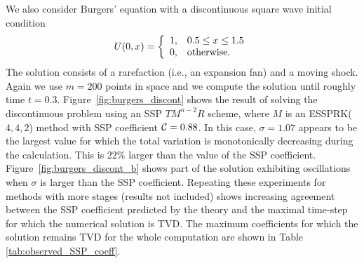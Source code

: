 We also consider Burgers' equation with a discontinuous
square wave initial condition
\begin{equation}\label{eq:burgers_discont_IC}
    U(0,x)  = \left\{
                \begin{array}{ll}
                  1, & \hbox{$0.5 \leq x \leq 1.5$} \\
                  0, & \hbox{otherwise.}
                \end{array}
              \right.
\end{equation}
The solution consists of a rarefaction (i.e., an expansion fan) and a
moving shock.
Again we use $m = 200$ points in space and we compute the solution until
roughly time $t = 0.3$.
Figure~\ref{fig:burgers_discont} shows the result of solving the
discontinuous problem using an SSP $TM^{n-2}R$ scheme, where $M$ is an
ESSPRK($4,4,2$) method with SSP coefficient $\mathcal{C} = 0.88$.
In this case, $\sigma = 1.07$ appears to be the largest value
for which the total variation is monotonically decreasing during the 
calculation.
This is $22\%$ larger than the value of the SSP coefficient.
Figure~\ref{fig:burgers_discont_b} shows part of the solution exhibiting 
oscillations when $\sigma$ is %
larger than the SSP coefficient.
Repeating these experiments for methods with more stages (results not
included) shows increasing agreement between the SSP coefficient
predicted by the theory and the maximal time-step for which the
numerical solution is TVD.
The maximum coefficients for which the solution remains TVD for the 
whole computation are shown in Table \ref{tab:observed_SSP_coeff}. 

